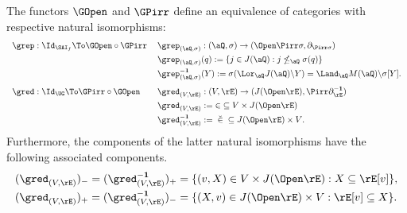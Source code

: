 \documentclass{article}
\begin{document}
\begin{theorem}
\label{thm:sai_equivalent_to_ug}
\item
The functors $\GOpen$ and $\GPirr$ define an equivalence of categories with respective natural isomorphisms:
\[
\begin{tabular}{lll}
$\grep : \Id_{\SAI_f} \To \GOpen \circ \GPirr$
& $\grep_{(\aQ,\sigma)} : (\aQ,\sigma) \to (\Open\Pirr\sigma,\partial_{\Pirr\sigma})$
\\[1ex]&
$\grep_{(\aQ,\sigma)}(q) := \{ j \in J(\aQ) : j \nleq_\aQ \sigma(q) \}$
\\[1ex]&
$\grep_{(\aQ,\sigma)}^{\bf-1}(Y) := \sigma(\Lor_\aQ J(\aQ) \backslash Y ) = \Land_\aQ M(\aQ) \backslash \sigma[Y]$.
\\[2ex]
$\gred : \Id_{\UG} \To \GPirr \circ \GOpen$
& $\gred_{(V,\rE)} : (V,\rE) \to  (J(\Open\rE),\Pirr\partial_\rE^{\bf-1})$
\\[1ex]&
$\gred_{(V,\rE)} := \;\in \; \subseteq V \times J(\Open\rE)$
\\[1ex]&
$\gred_{(V,\rE)}^{\bf-1} := \;\breve{\in} \; \subseteq J(\Open\rE) \times V$.
\end{tabular}
\]
Furthermore, the components of the latter natural isomorphisms have the following associated components.
\[
\begin{tabular}{lll}
$(\gred_{(V,\rE)})_- = (\gred_{(V,\rE)}^{\bf-1})_+ = \{ (v,X) \in V \times J(\Open\rE) : X \subseteq \rE[v] \}$,
\\[1ex]
$(\gred_{(V,\rE)})_+ = (\gred_{(V,\rE)}^{\bf-1})_- = \{  (X,v) \in J(\Open\rE) \times V : \rE[v] \subseteq X \}$.
\end{tabular}
\]
\end{theorem}
\end{document}
